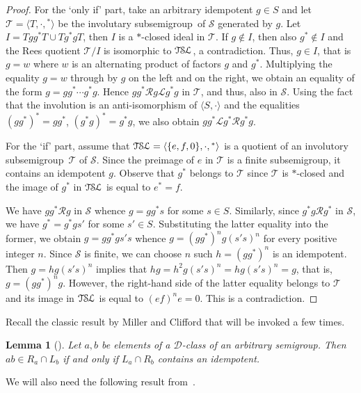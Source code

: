 \documentclass[11pt,reqno]{amsart}
\def\Rc{\mathrel{\mathscr{R}}}
\def\Lc{\mathrel{\mathscr{L}}}
\newcommand{\sgp}{semi\-group}
\newcommand{\TSL}{\ensuremath{\mathcal{T\kern-.5pt S\kern-.5pt L}}}
\newtheorem{Lemma}[Thm]{Lemma}
\begin{document}
\begin{proof}
For the `only if' part, take an arbitrary idempotent $g\in S$ and let $\mathcal{T}=\langle T,\cdot,{}^*\rangle$ be the involutary sub\sgp\
of $\mathcal{S}$ generated by $g$. Let $I=Tgg^*T\cup Tg^*gT$, then $I$ is a $*$-closed ideal in $\mathcal{T}$. If $g\notin I$, then also
$g^*\notin I$ and the Rees quotient $\mathcal{T}/I$ is isomorphic to $\TSL$, a contradiction. Thus, $g\in I$, that is $g=w$ where $w$ is an
alternating product of factors $g$ and $g^*$. Multiplying the equality $g=w$ through by $g$ on the left and on the right, we obtain an
equality of the form $g=gg^*\cdots g^*g$. Hence $gg^*\Rc g\Lc g^*g$ in $\mathcal{T}$, and thus, also in $\mathcal{S}$. Using the fact that
the involution is an anti-isomorphism of $\langle S,\cdot\rangle$ and the equalities $(gg^*)^*=gg^*$, $(g^*g)^*=g^*g$, we also obtain
$gg^*\Lc g^*\Rc g^*g$.

For the `if' part, assume that $\TSL=\langle\{e,f,0\},\cdot,{}^*\rangle$ is a quotient of an involutory sub\sgp\ $\mathcal{T}$ of
$\mathcal{S}$. Since the preimage of $e$ in $\mathcal{T}$ is a finite sub\sgp, it contains an idempotent $g$. Observe that $g^*$ belongs to
$\mathcal{T}$ since $\mathcal{T}$ is $*$-closed and the image of $g^*$ in $\TSL$ is equal to $e^*=f$.

We have $gg^*\Rc g$ in $\mathcal{S}$ whence $g=gg^*s$ for some $s\in S$. Similarly, since $g^*g\Rc g^*$ in $\mathcal{S}$, we have
$g^*=g^*gs'$ for some $s'\in S$. Substituting the latter equality into the former, we obtain $g=gg^*gs's$ whence $g=(gg^*)^ng(s's)^n$ for
every positive integer $n$. Since $\mathcal{S}$ is finite, we can choose $n$ such $h=(gg^*)^n$ is an idempotent. Then $g=hg(s's)^n$ implies
that $hg=h^2g(s's)^n=hg(s's)^n=g$, that is, $g=(gg^*)^ng$. However, the right-hand side of the latter equality belongs to $\mathcal{T}$ and
its image in $\TSL$ is equal to $(ef)^ne=0$. This is a contradiction.
\end{proof}

Recall the classic result by Miller and Clifford that will be invoked a few times.

\begin{Lemma}[{\mdseries\cite[Proposition~2.3.7]{how}}]
\label{Miller&Clifford} Let $a,b$ be elements of a $\mathscr{D}$-class of an arbitrary \sgp. Then $ab\in R_a\cap L_b$ if and only if
$L_a\cap R_b$ contains an idempotent.
\end{Lemma}

We will also need the following result from~\cite{ADV:2012}.
\end{document}
